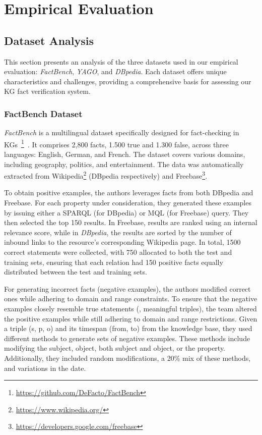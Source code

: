 \chapter{Empirical Evaluation}\label{ch:empirical-evaluation}

\section{Dataset Analysis}\label{sec:empirical-evaluation:dataset-analysis}
This section presents an analysis of the three datasets used in our empirical evaluation: \textit{FactBench}, \textit{YAGO}, and \textit{DBpedia}.
Each dataset offers unique characteristics and challenges, providing a comprehensive basis for assessing our \ac{KG} fact verification system.
\subsection{FactBench Dataset}\label{subsec:empirical-evaluation:dataset-analysis:factbench}
\textit{FactBench} is a multilingual dataset specifically designed for fact-checking in \acp{KG}~\footnote{\url{https://github.com/DeFacto/FactBench}}~\cite{GERBER201585}.
It comprises 2,800 facts, 1.500 true and 1.300 false, across three languages: English, German, and French.
The dataset covers various domains, including geography, politics, and entertainment.
The data was automatically extracted from Wikipedia\footnote{\url{https://www.wikipedia.org/}} (DBpedia respectively) and Freebase\footnote{\url{https://developers.google.com/freebase}}.

To obtain positive examples, the authors leverages facts from both DBpedia and Freebase.
For each property under consideration, they generated these examples by issuing either a SPARQL (for DBpedia) or MQL (for Freebase) query.
They then selected the top 150 results.
In Freebase, results are ranked using an internal relevance score, while in \textit{DBpedia}, the results are sorted by the number of inbound links to the resource’s corresponding Wikipedia page.
In total, 1500 correct statements were collected, with 750 allocated to both the test and training sets, ensuring that each relation had 150 positive facts equally distributed between the test and training sets.

For generating incorrect facts (negative examples), the authors modified correct ones while adhering to domain and range constraints.
To ensure that the negative examples closely resemble true statements (\ie, meaningful triples), the team altered the positive examples while still adhering to domain and range restrictions.
Given a triple (s, p, o) and its timespan (from, to) from the knowledge base, they used different methods to generate sets of negative examples.
These methods include modifying the subject, object, both subject and object, or the property.
Additionally, they included random modifications, a 20\% mix of these methods, and variations in the date.


